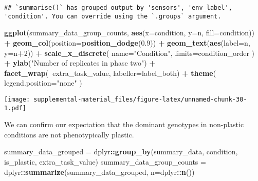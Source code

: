 \documentclass[]{book}
\newenvironment{Shaded}{\begin{snugshade}}{\end{snugshade}}
\newcommand{\DataTypeTok}[1]{\textcolor[rgb]{0.13,0.29,0.53}{#1}}
\newcommand{\DecValTok}[1]{\textcolor[rgb]{0.00,0.00,0.81}{#1}}
\newcommand{\FloatTok}[1]{\textcolor[rgb]{0.00,0.00,0.81}{#1}}
\newcommand{\KeywordTok}[1]{\textcolor[rgb]{0.13,0.29,0.53}{\textbf{#1}}}
\newcommand{\NormalTok}[1]{#1}
\newcommand{\OperatorTok}[1]{\textcolor[rgb]{0.81,0.36,0.00}{\textbf{#1}}}
\newcommand{\StringTok}[1]{\textcolor[rgb]{0.31,0.60,0.02}{#1}}
\begin{document}
\begin{verbatim}
## `summarise()` has grouped output by 'sensors', 'env_label', 'condition'. You can override using the `.groups` argument.
\end{verbatim}

\begin{Shaded}
\begin{Highlighting}[]
\KeywordTok{ggplot}\NormalTok{(summary_data_group_counts, }\KeywordTok{aes}\NormalTok{(}\DataTypeTok{x=}\NormalTok{condition, }\DataTypeTok{y=}\NormalTok{n, }\DataTypeTok{fill=}\NormalTok{condition)) }\OperatorTok{+}
\StringTok{  }\KeywordTok{geom_col}\NormalTok{(}\DataTypeTok{position=}\KeywordTok{position_dodge}\NormalTok{(}\FloatTok{0.9}\NormalTok{)) }\OperatorTok{+}
\StringTok{  }\KeywordTok{geom_text}\NormalTok{(}\KeywordTok{aes}\NormalTok{(}\DataTypeTok{label=}\NormalTok{n, }\DataTypeTok{y=}\NormalTok{n}\OperatorTok{+}\DecValTok{2}\NormalTok{)) }\OperatorTok{+}
\StringTok{  }\KeywordTok{scale_x_discrete}\NormalTok{(}
    \DataTypeTok{name=}\StringTok{"Condition"}\NormalTok{,}
    \DataTypeTok{limits=}\NormalTok{condition_order}
\NormalTok{  ) }\OperatorTok{+}
\StringTok{  }\KeywordTok{ylab}\NormalTok{(}\StringTok{"Number of replicates in phase two"}\NormalTok{) }\OperatorTok{+}
\StringTok{  }\KeywordTok{facet_wrap}\NormalTok{(}\OperatorTok{~}\NormalTok{extra_task_value, }\DataTypeTok{labeller=}\NormalTok{label_both) }\OperatorTok{+}
\StringTok{  }\KeywordTok{theme}\NormalTok{(}
    \DataTypeTok{legend.position=}\StringTok{"none"}
\NormalTok{  )}
\end{Highlighting}
\end{Shaded}

\texttt{[image: supplemental-material\_files/figure-latex/unnamed-chunk-30-1.pdf]}

We can confirm our expectation that the dominant genotypes in non-plastic conditions are not phenotypically plastic.

\begin{Shaded}
\begin{Highlighting}[]
\NormalTok{summary_data_grouped =}\StringTok{ }\NormalTok{dplyr}\OperatorTok{::}\KeywordTok{group_by}\NormalTok{(summary_data, condition, is_plastic, extra_task_value)}
\NormalTok{summary_data_group_counts =}\StringTok{ }\NormalTok{dplyr}\OperatorTok{::}\KeywordTok{summarize}\NormalTok{(summary_data_grouped, }\DataTypeTok{n=}\NormalTok{dplyr}\OperatorTok{::}\KeywordTok{n}\NormalTok{())}
\end{Highlighting}
\end{Shaded}
\end{document}
